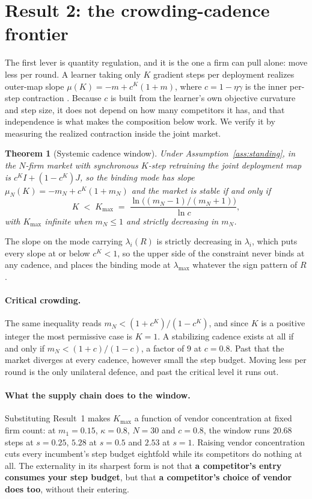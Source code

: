 \documentclass{article}
\theoremstyle{plain}
\newtheorem{theorem}{Theorem}
\theoremstyle{definition}
\newcommand{\mN}{m_N}
\newcommand{\lmax}{\lambda_{\max}}
\begin{document}
\section{Result 2: the crowding-cadence frontier}
\label{sec:cadence}

The first lever is quantity regulation, and it is the one a firm can pull alone: move less per round. A learner taking only $K$ gradient steps per deployment realizes outer-map slope $\mu(K) = -m + c^K(1+m)$, where $c = 1-\eta\gamma$ is the inner per-step contraction \citep{mendlerdunner2020}. Because $c$ is built from the learner's own objective curvature and step size, it does not depend on how many competitors it has, and that independence is what makes the composition below work. We verify it by measuring the realized contraction inside the joint market.

\begin{theorem}[Systemic cadence window]
\label{thm:cadence}
Under Assumption~\ref{ass:standing}, in the $N$-firm market with synchronous $K$-step retraining the joint deployment map is $c^K I + (1-c^K)J$, so the binding mode has slope $\mu_N(K) = -\mN + c^K(1+\mN)$ and the market is stable if and only if
\begin{equation}
K \;<\; K_{\max} \;=\; \frac{\ln\bigl((\mN-1)/(\mN+1)\bigr)}{\ln c},
\end{equation}
with $K_{\max}$ infinite when $\mN \le 1$ and strictly decreasing in $\mN$.
\end{theorem}

The slope on the mode carrying $\lambda_i(R)$ is strictly decreasing in $\lambda_i$, which puts every slope at or below $c^K<1$, so the upper side of the constraint never binds at any cadence, and places the binding mode at $\lmax$ whatever the sign pattern of $R$.

\paragraph{Critical crowding.}
The same inequality reads $\mN < (1+c^K)/(1-c^K)$, and since $K$ is a positive integer the most permissive case is $K=1$. A stabilizing cadence exists at all if and only if $\mN < (1+c)/(1-c)$, a factor of $9$ at $c=0.8$. Past that the market diverges at every cadence, however small the step budget. Moving less per round is the only unilateral defence, and past the critical level it runs out.

\paragraph{What the supply chain does to the window.}
Substituting Result~1 makes $K_{\max}$ a function of vendor concentration at fixed firm count: at $m_1 = 0.15$, $\kappa = 0.8$, $N=30$ and $c=0.8$, the window runs $20.68$ steps at $s = 0.25$, $5.28$ at $s = 0.5$ and $2.53$ at $s = 1$. Raising vendor concentration cuts every incumbent's step budget eightfold while its competitors do nothing at all. The externality in its sharpest form is not that \textbf{a competitor's entry consumes your step budget}, but that \textbf{a competitor's choice of vendor does too}, without their entering.
\end{document}
